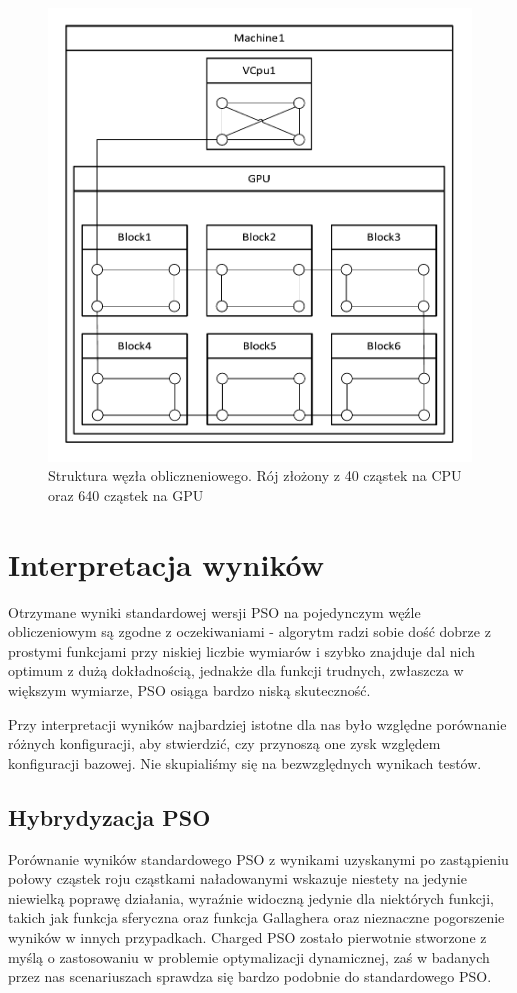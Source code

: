 \documentclass[12pt, twoside, openany, abstract=on]{report}
\theoremstyle{definition}
\begin{document}
\begin{figure}[H]
    \centering
 \includegraphics[width=1\textwidth,natwidth=610,natheight=642]{klasterBbobWithGPU.pdf}
 \caption{Struktura węzła obliczneniowego. Rój złożony z 40 cząstek na CPU oraz 640 cząstek na GPU}
\end{figure}

\section{Interpretacja wyników}
Otrzymane wyniki standardowej wersji PSO na pojedynczym węźle obliczeniowym są zgodne z oczekiwaniami - algorytm radzi sobie dość dobrze z prostymi funkcjami przy niskiej liczbie wymiarów i szybko znajduje dal nich optimum z dużą dokładnością, jednakże dla funkcji trudnych, zwłaszcza w większym wymiarze, PSO osiąga bardzo niską skuteczność.

Przy interpretacji wyników najbardziej istotne dla nas było względne porównanie różnych konfiguracji, aby stwierdzić, czy przynoszą one zysk względem konfiguracji bazowej. Nie skupialiśmy się na bezwzględnych wynikach testów.

\subsection{Hybrydyzacja PSO}
Porównanie wyników standardowego PSO z wynikami uzyskanymi po zastąpieniu połowy cząstek roju cząstkami naładowanymi wskazuje niestety na jedynie niewielką poprawę działania, wyraźnie widoczną jedynie dla niektórych funkcji, takich jak funkcja sferyczna oraz funkcja Gallaghera oraz nieznaczne pogorszenie wyników w innych przypadkach. Charged PSO zostało pierwotnie stworzone z myślą o zastosowaniu w problemie optymalizacji dynamicznej, zaś w badanych przez nas scenariuszach sprawdza się bardzo podobnie do standardowego PSO.
\end{document}
